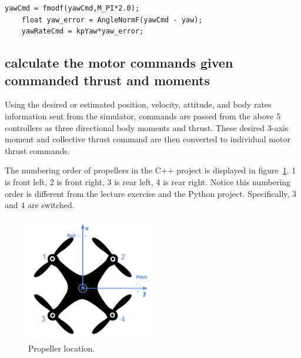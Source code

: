 \documentclass[a4paper]{article}
\begin{document}
\begin{lstlisting}[frame=single]
    yawCmd = fmodf(yawCmd,M_PI*2.0);
    float yaw_error = AngleNormF(yawCmd - yaw);
    yawRateCmd = kpYaw*yaw_error;
\end{lstlisting}

\subsection{calculate the motor commands given commanded thrust and moments} \label{control:motorcommand}

Using the desired or estimated position, velocity, attitude, and body rates information sent from the simulator, commands are passed from the above 5 controllers as three directional body moments and thrust. These desired 3-axis moment and collective thrust command are then converted to individual motor thrust commands.

The numbering order of propellers in the C++ project is displayed in figure~\ref{fig:drone1}. 1 is front left, 2 is front right, 3 is rear left, 4 is rear right. Notice this numbering order is different from the lecture exercise and the Python project. Specifically, 3 and 4 are switched. 

\begin{figure}[ht]
\centering
\includegraphics[width=0.5\textwidth]{./fig/drone1.png}
\caption{\label{fig:drone1} Propeller location.}
\end{figure}
\end{document}

